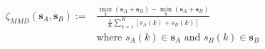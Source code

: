 \begin{equation}
\begin{split}
	\zeta_{MMD}(\textbf{s}_{A}, \textbf{s}_{B}) :=& \frac{\max_k\left(\textbf{s}_{A}+\textbf{s}_{B}\right) - \min_k\left(\textbf{s}_{A}+\textbf{s}_{B}\right)}{\frac{1}{K}\sum_{k=1}^{K}\left[{s}_{A}(k)+{s}_{B}(k)\right]}\\
	&\text{where } {s}_{A}(k) \in \textbf{s}_{A} \text{ and } {s}_{B}(k) \in \textbf{s}_{B}
\end{split}
\label{ch1:equ:min-max-difference-definition}
\end{equation}